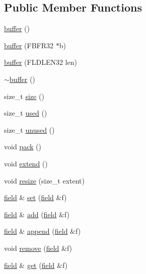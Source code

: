 \subsection*{Public Member Functions}
\begin{DoxyCompactItemize}
\item 
\hyperlink{classatmi_1_1buffer_ab5a434d367c856f9b1b7c831b98ff0d3}{buffer} ()
\item 
\hyperlink{classatmi_1_1buffer_a5a2836413da6d30d25afa2ea242cd90d}{buffer} (F\+B\+F\+R32 $\ast$b)
\item 
\hyperlink{classatmi_1_1buffer_ae2bc183e6b0909b8155dcfa17686a574}{buffer} (F\+L\+D\+L\+E\+N32 len)
\item 
\hyperlink{classatmi_1_1buffer_aa58097eacc94f1f5cc5e99b434ec7135}{$\sim$buffer} ()
\item 
size\+\_\+t \hyperlink{classatmi_1_1buffer_a2e24d67c781ef0052d3f1bfd7b958a0f}{size} ()
\item 
size\+\_\+t \hyperlink{classatmi_1_1buffer_a012274076a2b4f74258746e594ac5e92}{used} ()
\item 
size\+\_\+t \hyperlink{classatmi_1_1buffer_a89a04e518cd6bd9538463a3f384462e3}{unused} ()
\item 
void \hyperlink{classatmi_1_1buffer_ab9294b1a1e54e35717db40cb6bbb6de1}{pack} ()
\item 
void \hyperlink{classatmi_1_1buffer_a853e2a0585dda4e23ffa04297b824afb}{extend} ()
\item 
void \hyperlink{classatmi_1_1buffer_a95d13597c2f28bfc8ee5dac4db131179}{resize} (size\+\_\+t extent)
\item 
\hyperlink{classatmi_1_1field}{field} \& \hyperlink{classatmi_1_1buffer_a1fe98844cb17328390b3d4e658bd6903}{set} (\hyperlink{classatmi_1_1field}{field} \&f)
\item 
\hyperlink{classatmi_1_1field}{field} \& \hyperlink{classatmi_1_1buffer_a5f30826d8273b619380e8b4f039af094}{add} (\hyperlink{classatmi_1_1field}{field} \&f)
\item 
\hyperlink{classatmi_1_1field}{field} \& \hyperlink{classatmi_1_1buffer_a4a9abeb69354fa575c8b27c9af170e79}{append} (\hyperlink{classatmi_1_1field}{field} \&f)
\item 
void \hyperlink{classatmi_1_1buffer_a4a1ef484befbf22aca919fc1a312ab61}{remove} (\hyperlink{classatmi_1_1field}{field} \&f)
\item 
\hyperlink{classatmi_1_1field}{field} \& \hyperlink{classatmi_1_1buffer_affb14c05bc21e29c3a2f6dc03c30c0fa}{get} (\hyperlink{classatmi_1_1field}{field} \&f)

\end{DoxyCompactItemize}
